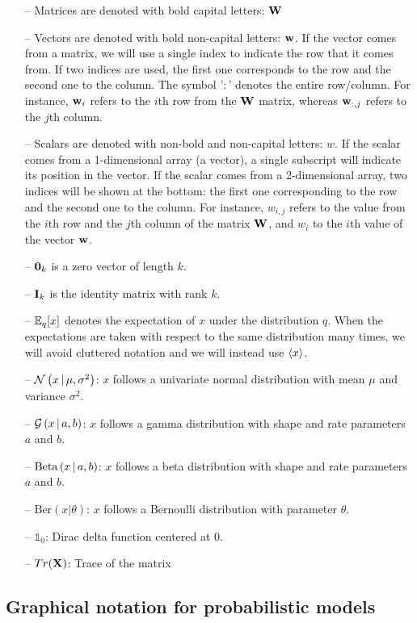 \begin{itemize}[noitemsep]
	\item[--] Matrices are denoted with bold capital letters: ${\bf W}$
	\item[--] Vectors are denoted with bold non-capital letters: ${\bf w}$. If the vector comes from a matrix, we will use a single index to indicate the row that it comes from. If two indices are used, the first one corresponds to the row and the second one to the column. The symbol '$:$' denotes the entire row/column. For instance, ${\bf w}_{i}$ refers to the $i$th row from the ${\bf W}$ matrix, whereas ${\bf w}_{:,j}$ refers to the $j$th column.
	\item[--] Scalars are denoted with non-bold and non-capital letters: $w$. If the scalar comes from a 1-dimensional array (a vector), a single subscript will indicate its position in the vector. If the scalar comes from a 2-dimensional array, two indices will be shown at the bottom: the first one corresponding to the row and the second one to the column. For instance, $w_{i,j}$ refers to the value from the $i$th row and the $j$th column of the matrix ${\bf W}$, and $w_i$ to the $i$th value of the vector ${\bf w}$.
	\item[--] ${\bf 0}_k$ is a zero vector of length $k$.
	\item[--] ${\bf I}_k$ is the identity matrix with rank $k$.
	\item[--] $\mathbb{E}_q[x]$ denotes the expectation of $x$ under the distribution $q$. When the expectations are taken with respect to the same distribution many times, we will avoid cluttered notation and we will instead use $\langle x \rangle$.
	\item[--] $\mathcal{N}\left(x \,|\, \mu,\sigma^2\right)$: $x$ follows a univariate normal distribution with mean $\mu$ and variance $\sigma^2$.
	\item[--] $\mathcal{G}\left(x \,|\, a,b\right)$: $x$ follows a gamma distribution with shape and rate parameters $a$ and $b$.
	\item[--] $\text{Beta}\left(x \,|\, a, b\right)$: $x$ follows a beta distribution with shape and rate parameters $a$ and $b$.
	\item[--] $\text{Ber}(x|\theta)$: $x$ follows a Bernoulli distribution with parameter $\theta$.
	\item[--] $\mathds{1}_0$: Dirac delta function centered at 0.
	\item[--] $Tr({\bf X})$: Trace of the matrix \bfX
\end{itemize}

\subsection*{Graphical notation for probabilistic models}

